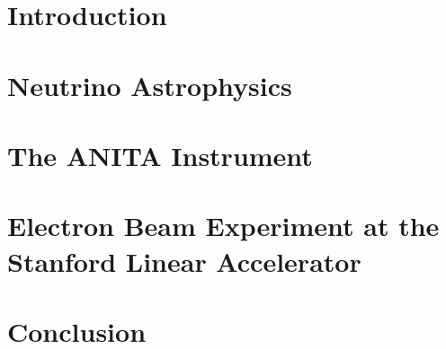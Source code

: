 \chapter{Introduction}
\label{c:intro}

%
\chapter{Neutrino Astrophysics}
\label{c:nuAstro}

%
\chapter{The ANITA Instrument}
\label{c:anita}

%
\chapter{Electron Beam Experiment at the Stanford Linear Accelerator}
\label{c:slac}

%
\chapter{Conclusion}
\label{c:concl}


